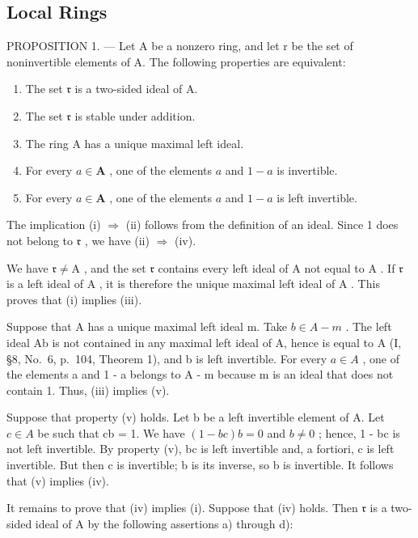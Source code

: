 \subsection{Local Rings}

PROPOSITION 1. --- Let A be a nonzero ring, and let r be the set of noninvertible elements of A. The following properties are equivalent:

\begin{enumerate}
\def\labelenumi{(\roman{enumi})}
\item
  The set \(\mathfrak{r}\) is a two-sided ideal of A.
\item
  The set \(\mathfrak{r}\) is stable under addition.
\item
  The ring A has a unique maximal left ideal.
\item
  For every \(a \in \mathbf{A}\) , one of the elements \(a\) and \(1 - a\) is invertible.
\item
  For every \(a \in \mathbf{A}\) , one of the elements \(a\) and \(1 - a\) is left invertible.
\end{enumerate}

The implication (i) \(\Rightarrow\) (ii) follows from the definition of an ideal. Since 1 does not belong to \(\mathfrak{r}\) , we have (ii) \(\Rightarrow\) (iv).

We have \(\mathfrak{r} \neq \mathrm{A}\) , and the set \(\mathfrak{r}\) contains every left ideal of \(\mathrm{A}\) not equal to \(\mathrm{A}\) . If \(\mathfrak{r}\) is a left ideal of \(\mathrm{A}\) , it is therefore the unique maximal left ideal of \(\mathrm{A}\) . This proves that (i) implies (iii).

Suppose that A has a unique maximal left ideal m. Take \(b \in A - m\) . The left ideal Ab is not contained in any maximal left ideal of A, hence is equal to A (I, §8, No.~6, p.~104, Theorem 1), and b is left invertible. For every \(a \in A\) , one of the elements a and 1 - a belongs to A - m because m is an ideal that does not contain 1. Thus, (iii) implies (v).

Suppose that property (v) holds. Let b be a left invertible element of A. Let \(c \in A\) be such that cb = 1. We have \((1 - bc)b = 0\) and \(b \neq 0\) ; hence, 1 - bc is not left invertible. By property (v), bc is left invertible and, a fortiori, c is left invertible. But then c is invertible; b is its inverse, so b is invertible. It follows that (v) implies (iv).

It remains to prove that (iv) implies (i). Suppose that (iv) holds. Then \(\mathfrak{r}\) is a two-sided ideal of A by the following assertions a) through d):

